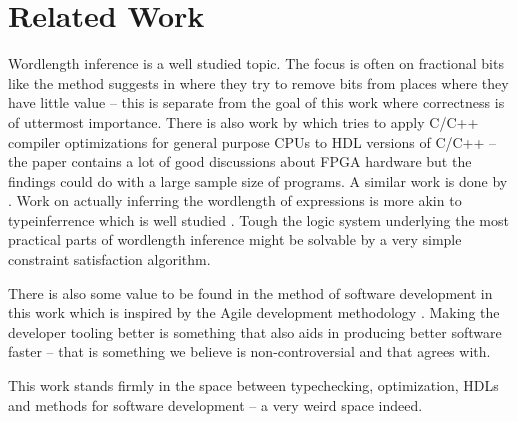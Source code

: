 \chapter{Related Work}
Wordlength inference is a well studied topic. The focus is often on fractional bits like the method \citeauthor{src:MinOfFrac} suggests in \cite{src:MinOfFrac} where they try to remove bits from places where they have little value -- this is separate from the goal of this work where correctness is of uttermost importance. There is also work \cite{src:HLSandOpt} by \citeauthor{src:HLSandOpt} which tries to apply C/C++ compiler optimizations for general purpose CPUs to HDL versions of C/C++ -- the paper contains a lot of good discussions about FPGA hardware but the findings could do with a large sample size of programs. A similar work is done by \citeauthor{src:ConFPGA}. Work on actually inferring the wordlength of expressions is more akin to typeinferrence which is well studied \cite{src:DamasHindleyMilner}\cite{src:TypeCheckersBook}\cite{src:BiTy}. Tough the logic system underlying the most practical parts of wordlength inference might be solvable by a very simple constraint satisfaction algorithm.

There is also some value to be found in the method of software development in this work which is inspired by the Agile development methodology \cite{src:Agile}. Making the developer tooling better is something that also aids in producing better software faster -- that is something we believe is non-controversial and that \cite{src:Agile} agrees with.

This work stands firmly in the space between typechecking, optimization, HDLs and methods for software development -- a very weird space indeed.
